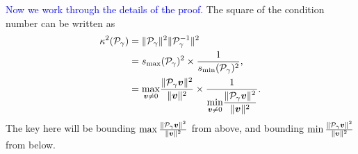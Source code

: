 \documentclass[a4paper,10pt]{article}
\newcommand{\tcb}{\textcolor{blue}}
\begin{document}
\tcb{Now we work through the details of the proof.} The square of the condition number can be written as
\begin{align}
\nonumber
\kappa^2({\cal P}_{\gamma}) 
&= 
\Vert {\cal P}_{\gamma} \Vert^2 
\Vert {\cal P}_{\gamma}^{-1} \Vert^2 \\
\nonumber
&=
s_{\rm max} ({\cal P}_{\gamma})^2 \times \frac{1}{s_{\rm min} ({\cal P}_{\gamma})^2},\\
\label{eq:kappa_def}
&=
\underset{{\bm{v} \neq 0}}{\max} \frac{\Vert {\cal P}_{\gamma} \bm{v} \Vert^2 }{\Vert \bm{v} \Vert^2} 
\times 
\frac{1}{\displaystyle{\underset{{\bm{v} \neq 0}}{\min} \frac{\Vert {\cal P}_{\gamma} \bm{v} \Vert^2 }{\Vert \bm{v} \Vert^2}}}.
\end{align}
The key here will be bounding $\max \frac{\Vert {\cal P}_{\gamma} \bm{v} \Vert^2 }{\Vert \bm{v} \Vert^2}$ from above, and bounding $\min \frac{\Vert {\cal P}_{\gamma} \bm{v} \Vert^2 }{\Vert \bm{v} \Vert^2}$ from below.
\end{document}
